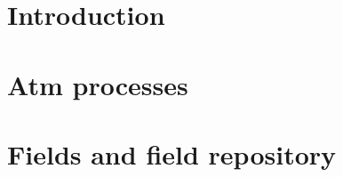 \documentclass[10pt]{article}
\begin{document}
\section{Introduction}

\section{Atm processes}

\section{Fields and field repository}
\end{document}
